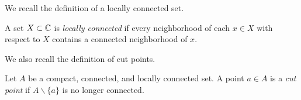 \documentclass[12pt]{amsart}
\numberwithin{equation}{section}
\begin{document}
	We recall the definition of a locally connected set.
	\begin{definition}
		A set $X \subset \mathbb{C}$ is \emph{locally connected} if every
		neighborhood of each $x \in X$ with respect to $X$ contains a connected neighborhood of $x$. 
	\end{definition}
	
	We also recall the definition of cut points. 
	\begin{definition}
		Let $A$ be a compact, connected, and locally connected set. A point $a \in A$ is a \emph{cut point} 
		if $A \backslash \{a\}$ is no longer connected.
	\end{definition}
	
	
	
	
\end{document}
